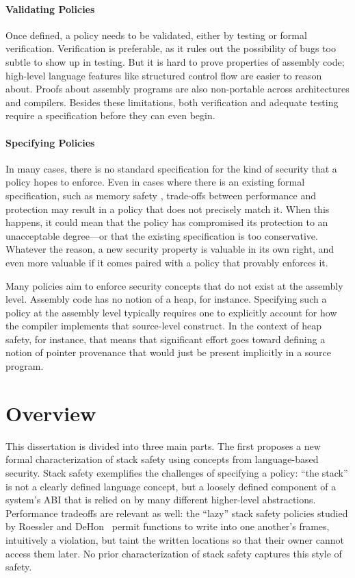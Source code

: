 \documentclass{report}
\begin{document}
\paragraph{Validating Policies}

Once defined, a policy needs to be validated, either by testing or formal verification. Verification is
preferable, as it rules out the possibility of bugs too subtle to show up in testing.
But it is hard to prove properties of assembly code; high-level language features like
structured control flow are easier to reason about. Proofs about assembly programs are
also non-portable across architectures and compilers.
Besides these limitations, both verification and adequate testing require a specification before
they can even begin.

\paragraph{Specifying Policies}

In many cases, there is no standard specification for the kind of security that a policy hopes
to enforce. Even in cases where there is an existing formal specification, such as
memory safety \cite{Azevedo+16}, trade-offs between performance and protection may result in a
policy that does not precisely match it. When this happens, it could mean that the policy
has compromised its protection to an unacceptable degree---or that the existing specification
is too conservative. Whatever the reason, a new security property is valuable in its own right,
and even more valuable if it comes paired with a policy that provably enforces it.

Many policies aim to enforce security concepts that do not exist at the assembly level. Assembly
code has no notion of a heap, for instance. Specifying such a policy at the assembly
level typically requires one to explicitly account for how the compiler implements that source-level
construct. In the context of heap safety, for instance, that means that significant effort goes
toward defining a notion of pointer provenance that would just be present implicitly in a
source program.

\section{Overview}

This dissertation is divided into three main parts. The first proposes a new formal characterization
of stack safety using concepts from language-based security. Stack safety exemplifies the challenges
of specifying a policy: ``the stack'' is not a clearly defined language concept, but a loosely
defined component of a system's ABI that is relied on by many different higher-level abstractions.
Performance tradeoffs are relevant as well: the ``lazy'' stack safety policies studied by
Roessler and DeHon~\cite{RoesslerD18} permit functions to write into one another's
frames, intuitively a violation, but taint the written locations so that their owner cannot
access them later. No prior characterization of stack safety captures this style of safety.
\end{document}
